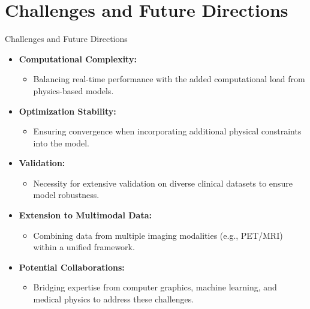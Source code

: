 \documentclass{beamer}
\begin{document}
\section{Challenges and Future Directions}
\begin{frame}{Challenges and Future Directions}
    \begin{itemize}
        \item \textbf{Computational Complexity:}
        \begin{itemize}
            \item Balancing real-time performance with the added computational load from physics-based models.
        \end{itemize}
        \item \textbf{Optimization Stability:}
        \begin{itemize}
            \item Ensuring convergence when incorporating additional physical constraints into the model.
        \end{itemize}
        \item \textbf{Validation:}
        \begin{itemize}
            \item Necessity for extensive validation on diverse clinical datasets to ensure model robustness.
        \end{itemize}
        \item \textbf{Extension to Multimodal Data:}
        \begin{itemize}
            \item Combining data from multiple imaging modalities (e.g., PET/MRI) within a unified framework.
        \end{itemize}
        \item \textbf{Potential Collaborations:}
        \begin{itemize}
            \item Bridging expertise from computer graphics, machine learning, and medical physics to address these challenges.
        \end{itemize}
    \end{itemize}
\end{frame}

\end{document}
